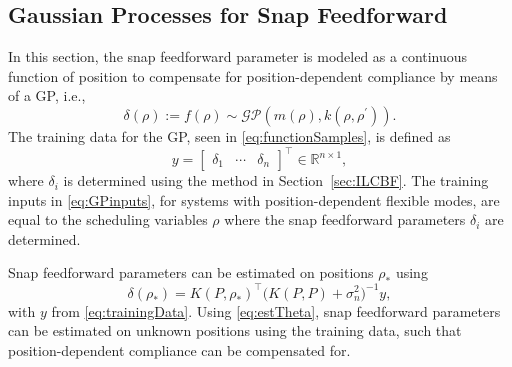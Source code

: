\documentclass[letterpaper, 10 pt, conference]{ieeeconf}  %
\begin{document}
\subsection{Gaussian Processes for Snap Feedforward}
In this section, the snap feedforward parameter is modeled as a continuous function of position to compensate for position-dependent compliance by means of a GP, i.e.,
\begin{equation}
	\label{eq:GPSnapParameter}
	\delta(\rho) := f(\rho) \sim \mathcal{GP}(m(\rho),k(\rho,\rho^\prime)).
\end{equation}
The training data for the GP, seen in \eqref{eq:functionSamples}, is defined as
\begin{equation}
	\label{eq:trainingData}
	y = \begin{bmatrix} 
		\delta_{1} & \cdots & \delta_{n}
	\end{bmatrix}^\top \in \mathbb{R}^{n\times 1},
\end{equation}
where $\delta_{i}$ is determined using the method in Section~\ref{sec:ILCBF}. The training inputs in \eqref{eq:GPinputs}, for systems with position-dependent flexible modes, are equal to the scheduling variables $\rho$ where the snap feedforward parameters $\delta_i$ are determined. \par
Snap feedforward parameters can be estimated on positions $\rho_*$ using
\begin{equation}
	\label{eq:estTheta}
	\delta(\rho_*) = K(P,\rho_*)^\top \big(K(P, P)+\sigma_{n}^{2}\big)^{-1} y,
\end{equation}
with $y$ from \eqref{eq:trainingData}. Using \eqref{eq:estTheta}, snap feedforward parameters can be estimated on unknown positions using the training data, such that position-dependent compliance can be compensated for. 
\end{document}
